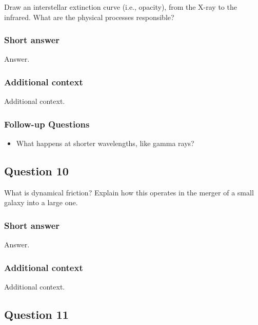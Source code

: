 \documentclass[a4paper,10pt]{article}
\begin{document}
Draw an interstellar extinction curve (i.e., opacity), from the X-ray to the infrared. What are the physical processes responsible?

\subsubsection{Short answer}

Answer.

\subsubsection{Additional context}

Additional context.

\subsubsection{Follow-up Questions}

\begin{itemize}
    \item What happens at shorter wavelengths, like gamma rays?
\end{itemize}


\newpage
\subsection{Question 10}

What is dynamical friction? Explain how this operates in the merger of a small galaxy into a large one.

\subsubsection{Short answer}

Answer.

\subsubsection{Additional context}

Additional context.


\newpage
\subsection{Question 11}
\end{document}

